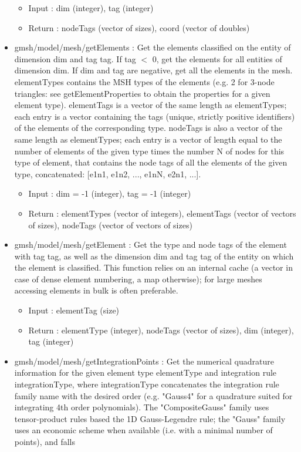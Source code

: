 \documentclass[dvipdfmx, 9pt, a4paper]{article}
\numberwithin{equation}{section}
\begin{document}
\begin{itemize}
\begin{itemize}
\item Input : dim (integer), tag (integer)
\item Return : nodeTags (vector of sizes), coord (vector of doubles)
\end{itemize}
\item gmsh/model/mesh/getElements : Get the elements classified on the entity of dimension dim and tag tag. If tag $<$ 0, get the elements for all entities of dimension dim. If dim and tag are negative, get all the elements in the mesh. elementTypes contains the MSH types of the elements (e.g. 2 for 3-node triangles: see getElementProperties to obtain the properties for a given element type). elementTags is a vector of the same length as elementTypes; each entry is a vector containing the tags (unique, strictly positive identifiers) of the elements of the corresponding type. nodeTags is also a vector of the same length as elementTypes; each entry is a vector of length equal to the number of elements of the given type times the number N of nodes for this type of element, that contains
the node tags of all the elements of the given type, concatenated: [e1n1, e1n2, ..., e1nN, e2n1, ...].
\begin{itemize}
\item Input : dim = -1 (integer), tag = -1 (integer)
\item Return : elementTypes (vector of integers), elementTags (vector of vectors of sizes), nodeTags (vector of vectors of sizes)
\end{itemize}
\item gmsh/model/mesh/getElement : Get the type and node tags of the element with tag tag, as well as the dimension dim and tag tag of the entity on which the element is classified. This function relies on an internal cache (a vector in case of dense element numbering, a map otherwise); for large meshes accessing elements in bulk is often preferable.
\begin{itemize}
\item Input : elementTag (size)
\item Return : elementType (integer), nodeTags (vector of sizes), dim (integer), tag (integer)
\end{itemize}
\item gmsh/model/mesh/getIntegrationPoints : Get the numerical quadrature information for the given element type elementType and integration rule integrationType, where integrationType concatenates the integration rule family name with the desired order (e.g. "Gauss4" for a quadrature suited for integrating 4th order polynomials). The "CompositeGauss" family uses tensor-product rules based the 1D Gauss-Legendre rule; the "Gauss" family uses an economic scheme when available (i.e. with a minimal number of points), and falls

\end{itemize}
\end{document}
